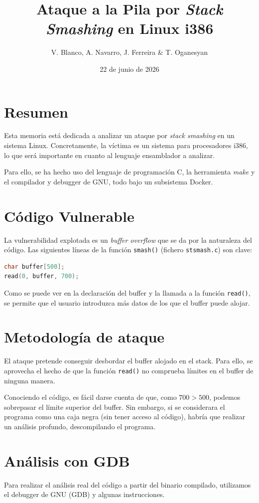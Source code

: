 \documentclass[11pt,a4paper,twocolumn]{article}
\author{V. Blanco, A. Navarro, J. Ferreira \& T. Oganesyan}
\date{22 de junio de 2026}
\title{\textbf{Ataque a la Pila por \textit{Stack Smashing} en Linux i386}}
\begin{document}
\maketitle

\section{Resumen}
Esta memoria está dedicada a analizar un ataque por \textit{stack smashing} en un sistema Linux. Concretamente, la víctima es un sistema para procesadores i386, lo que será importante en cuanto al lenguaje ensamblador a analizar.

Para ello, se ha hecho uso del lenguaje de programación C, la herramienta \textit{make} y el compilador y debugger de GNU, todo bajo un subsistema Docker.

\section{Código Vulnerable}
La vulnerabilidad explotada es un \textit{buffer overflow} que se da por la naturaleza del código. Las siguientes líneas de la función \texttt{smash()} (fichero \texttt{stsmash.c}) son clave:

\begin{lstlisting}[language=C]
char buffer[500];
read(0, buffer, 700);
\end{lstlisting}

Como se puede ver en la declaración del buffer y la llamada a la función \texttt{read()}, se permite que el usuario introduzca más datos de los que el buffer puede alojar.

\section{Metodología de ataque}
El ataque pretende conseguir desbordar el buffer alojado en el stack. Para ello, se aprovecha el hecho de que la función \texttt{read()} no comprueba límites en el buffer de ninguna manera.

Conociendo el código, es fácil darse cuenta de que, como $700>500$, podemos sobrepasar el límite superior del buffer. Sin embargo, si se considerara el programa como una caja negra (sin tener acceso al código), habría que realizar un análisis profundo, descompilando el programa.

\section{Análisis con GDB}
Para realizar el análisis real del código a partir del binario compilado, utilizamos el debugger de GNU (GDB) y algunas instrucciones.
\end{document}
